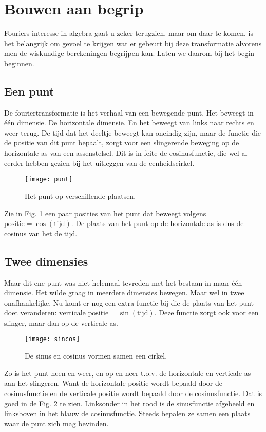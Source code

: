 \documentclass[11pt,fleqn]{book} %
\begin{document}
\section{Bouwen aan begrip}
Fouriers interesse in algebra gaat u zeker terugzien, maar om daar te komen, is het belangrijk om gevoel te krijgen wat er gebeurt bij deze transformatie alvorens men de wiskundige berekeningen begrijpen kan. Laten we daarom bij het begin beginnen.

\subsection{Een punt}
De fouriertransformatie is het verhaal van een bewegende punt. Het beweegt in één dimensie. De horizontale dimensie. En het beweegt van links naar rechts en weer terug. De tijd dat het deeltje beweegt kan oneindig zijn, maar de functie die de positie van dit punt bepaalt, zorgt voor een slingerende beweging op de horizontale as van een assenstelsel. Dit is in feite de cosinusfunctie, die wel al eerder hebben gezien bij het uitleggen van de eenheidscirkel.
\begin{figure}[h]
	\centering\texttt{[image: punt]}
	\caption{Het punt op verschillende plaatsen.}
	\label{fig:punt}
\end{figure}

Zie in Fig. \ref{fig:punt} een paar posities van het punt dat beweegt volgens $\text{positie}=\cos{(\text{tijd})}$. De plaats van het punt op de horizontale as is dus de cosinus van het de tijd.

\subsection{Twee dimensies}
Maar dit ene punt was niet helemaal tevreden met het bestaan in maar één dimensie. Het wilde graag in meerdere dimensies bewegen. Maar wel in twee onafhankelijke. Nu komt er nog een extra functie bij die de plaats van het punt doet veranderen: $\text{verticale positie}=\sin{(\text{tijd})}$. Deze functie zorgt ook voor een slinger, maar dan op de verticale as.
\begin{figure}[h]
	\centering\texttt{[image: sincos]}
	\caption{De sinus en cosinus vormen samen een cirkel.}
	\label{fig:sincos}
\end{figure}

Zo is het punt heen en weer, en op en neer t.o.v. de horizontale en verticale as aan het slingeren. Want de horizontale positie wordt bepaald door de cosinusfunctie en de verticale positie wordt bepaald door de cosinusfunctie. Dat is goed in de Fig. \ref{fig:sincos} te zien. Linksonder in het rood is de sinusfunctie afgebeeld en linksboven in het blauw de cosinusfunctie. Steeds bepalen ze samen een plaats waar de punt zich mag bevinden.
\end{document}
